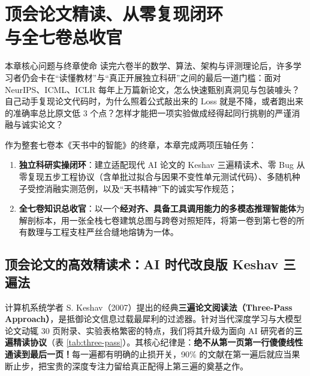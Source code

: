 \chapter[顶会精读、从零复现与全七卷总收官]{顶会论文精读、从零复现闭环\\与全七卷总收官}\label{ch:repro-capstone}


\begin{chapIntro}{本章核心问题与终章使命}
读完六卷半的数学、算法、架构与评测理论后，许多学习者仍会卡在“读懂教材”与“真正开展独立科研”之间的最后一道门槛：面对 NeurIPS、ICML、ICLR 每年上万篇新论文，怎么快速甄别真洞见与包装噱头？自己动手复现论文代码时，为什么照着公式敲出来的 Loss 就是不降，或者跑出来的准确率总比原文低 $3$ 个点？怎样才能把一项实验做成经得起同行挑剔的严谨消融与诚实论文？

作为整套七卷本《天书中的智能》的终章，本章完成两项压轴任务：
\begin{enumerate}
  \item \textbf{独立科研实操闭环}：建立适配现代 AI 论文的 Keshav 三遍精读术、零 Bug 从零复现五步工程协议（含单批过拟合与因果不变性单元测试代码）、多随机种子受控消融实测范例，以及“天书精神”下的诚实写作规范；
  \item \textbf{全七卷知识总收官}：以一个\textbf{经对齐、具备工具调用能力的多模态推理智能体}为解剖标本，用一张全栈七卷建筑总图与跨卷对照矩阵，将第一卷到第七卷的所有数理与工程支柱严丝合缝地熔铸为一体。
\end{enumerate}
\end{chapIntro}

\section{顶会论文的高效精读术：AI 时代改良版 Keshav 三遍法}

计算机系统学者 S. Keshav（2007）提出的经典\textbf{三遍论文阅读法（Three-Pass Approach）}，是抵御论文信息过载最犀利的过滤器。针对当代深度学习与大模型论文动辄 30 页附录、实验表格繁密的特点，我们将其升级为面向 AI 研究者的\textbf{三遍精读协议}（表 \ref{tab:three-pass}）。其核心纪律是：\textbf{绝不从第一页第一行傻傻线性通读到最后一页！}每一遍都有明确的止损开关，90\% 的文献在第一遍后就应当果断止步，把宝贵的深度专注力留给真正配得上第三遍的奠基之作。

